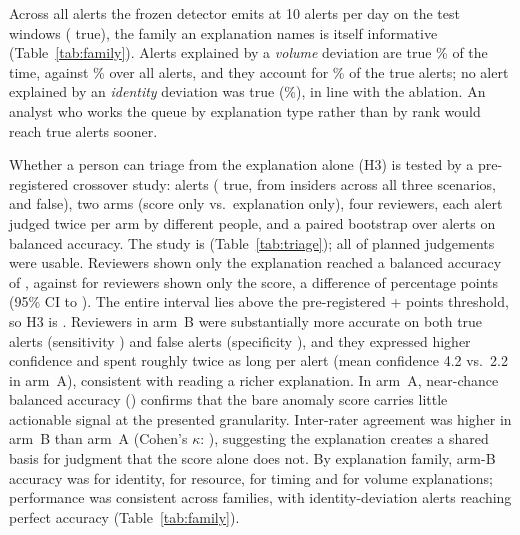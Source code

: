 Across all \ExpNAlerts{} alerts the frozen detector emits at 10 alerts per day on the test windows
(\ExpNTrue{} true), the family an explanation names is itself informative (Table~\ref{tab:family}).
Alerts explained by a \emph{volume} deviation are true \ExpVolPrec\% of the time, against
\ExpAllPrec\% over all alerts, and they account for \ExpVolShareTrue\% of the true alerts; no alert
explained by an \emph{identity} deviation was true (\ExpIdnPrec\%), in line with the ablation. An
analyst who works the queue by explanation type rather than by rank would reach true alerts sooner.


Whether a person can triage from the explanation alone (H3) is tested by a pre-registered crossover
study: \StudyN{} alerts (\StudyTrue{} true, from \StudyInsiders{} insiders across all three
scenarios, and \StudyFalse{} false), two arms
(score only vs.\ explanation only), four reviewers, each alert judged twice per arm by different
people, and a paired bootstrap over alerts on balanced accuracy. The study is \TriageStatus{}
(Table~\ref{tab:triage}); all \TriageNUsable{} of \TriageNExpected{} planned judgements were usable.
Reviewers shown only the explanation reached a balanced accuracy of \TriageBAB{}, against
\TriageBAA{} for reviewers shown only the score, a difference of \TriageDiff{} percentage points
(95\% CI \TriageLo{} to \TriageHi{}). The entire interval lies above the pre-registered
+\TriageThr{} points threshold, so H3 is \textsc{\TriageVerdict}. Reviewers in arm~B were
substantially more accurate on both true alerts (sensitivity \TriageSensB{}) and false alerts
(specificity \TriageSpecB{}), and they expressed higher confidence and spent roughly twice as long
per alert (mean confidence 4.2 vs.\ 2.2 in arm~A), consistent with reading a
richer explanation. In arm~A, near-chance balanced accuracy (\TriageBAA{}) confirms that the bare
anomaly score carries little actionable signal at the presented granularity. Inter-rater agreement
was higher in arm~B than arm~A (Cohen's $\kappa$: \TriageKappas), suggesting the explanation
creates a shared basis for judgment
that the score alone does not. By explanation family, arm-B accuracy was
\TriageFamIdn{} for identity, \TriageFamRes{} for resource, \TriageFamTmp{} for timing and
\TriageFamVol{} for volume explanations; performance was consistent across families, with
identity-deviation alerts reaching perfect accuracy (Table~\ref{tab:family}).

\begin{table}[t]
\centering
\caption{Triage study (H3): judgements pooled over four reviewers, 40 alerts (20 true).}
\label{tab:triage}
\end{table}

